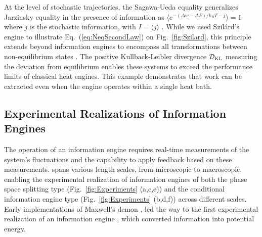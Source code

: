 \documentclass[aps, twocolumn,floatfix,showpacs, superscriptaddress]{revtex4-2}
\begin{document}
At the level of stochastic trajectories, the Sagawa-Ueda equality generalizes Jarzinsky equality in the presence of information as $\langle e^{-(\Delta w-\Delta F)/k_B T - j} \rangle = 1$ where $j$ is the stochastic information, with $I = \langle j \rangle$ \cite{Sagawa2010}.
While we used Szil\'ard's engine to illustrate Eq.~(\ref{eq:NeqSecondLaw}) on Fig.~\ref{fig:Szilard}, this principle extends beyond information engines to encompass all transformations between non-equilibrium states \cite{esposito_second_2011}. The positive Kullback-Leibler divergence $\mathcal{D}_{\rm KL}$ measuring the deviation from equilibrium enables these systems to exceed the performance limits of classical heat engines. This example demonstrates that work can be extracted even when the engine operates within a single heat bath.

\subsection{Experimental Realizations of Information Engines}
\label{Sec:History}

The operation of an information engine requires real-time measurements of the system's fluctuations and the capability to apply feedback based on these measurements. spans various length scales, from microscopic to macroscopic, enabling the experimental realization of information engines of both the phase space splitting type (Fig.~\ref{fig:Experiments} (a,c,e)) and the conditional information engine type (Fig.~\ref{fig:Experiments} (b,d,f)) across different scales. Early implementations of Maxwell's demon \cite{serreli_molecular_2007, raizen_comprehensive_2009}, led the way to the first experimental realization of an information engine \cite{toyabe_experimental_2010}, which converted information into potential energy.
\end{document}
